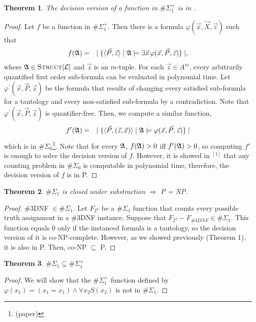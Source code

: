 \documentclass[12pt]{article}
\def\A{{\frak A}}
\def\L{{\cal L}}
\def\P{\vec{P}}
\def\X{\vec{X}}
\def\x{\vec{x}}
\def\z{\vec{z}}
\newtheorem{theo}{Theorem}
\begin{document}
\begin{theo}
The decision version of a function in $\#\Sigma_1^{+}$ is in .
\end{theo}
\begin{proof}
Let $f$ be a function in $\#\Sigma_1^{+}$. Then there is a formula $\varphi(\x,\X,\z)$ such that
\begin{eqnarray*}
f(\A) &=& \mid \{ \langle\P,\z\rangle \mid \A \models \exists \x \, \varphi(\x,\P,\z) \} \mid,
\end{eqnarray*}
where $\A \in \textsc{Struct}[\L]$ and $\z$ is an $m$-tuple. For each $\z \in A^m$, every arbitrarily quantified first order sub-formula can be evaluated in polynomial time. Let $\varphi^\prime(\x,\P,\z)$ be the formula that results of changing every satisfied sub-formula for a tautology and every non-satisfied sub-formula by a contradiction. Note that $\varphi^\prime(\x,\P,\z)$ is quantifier-free. Then, we compute a similar function,
\begin{eqnarray*}
f'(\A) &=& \mid \{ \langle\P,(\z,\x)\rangle \mid \A \models \varphi(\x,\P,\z) \} \mid
\end{eqnarray*}
which is in $\#\Sigma_0$\footnote[1]{(paper)}. Note that for every $\A$, $f(\A) > 0$ iff $f'(\A) > 0$, so computing $f'$ is enough to solve the decision version of $f$. However, it is showed in $^{[1]}$ that any counting problem in $\#\Sigma_0$ is computable in polynomial time, therefore, the decision version of $f$ is in P.
\end{proof}

\begin{theo}
$\#\Sigma_1$ is closed under substraction $\Rightarrow$ P = NP.
\end{theo}
\begin{proof}
\#3DNF $\in \#\Sigma_1$. Let $F_{2^n}$ be a $\#\Sigma_1$ function that counts every possible truth assignment in a \#3DNF instance. Suppose that $F_{2^n}-F_{\#3DNF} \in \#\Sigma_1$. This function equals 0 only if the instanced formula is a tautology, so the decision version of it is co-NP-complete. However, as we showed previously (Theorem 1), it is also in P. Then, co-NP $\subseteq$ P.
\end{proof}

\begin{theo}
$\#\Sigma_1 \subsetneq \#\Sigma_1^{+}$
\end{theo}
\begin{proof}
We will show that the $\#\Sigma_1^{+}$ function defined by $\varphi(x_1) = (x_1 = x_1) \wedge \forall x_2 S(x_2)$ is not in $\#\Sigma_1$.
\end{proof}
\end{document}
